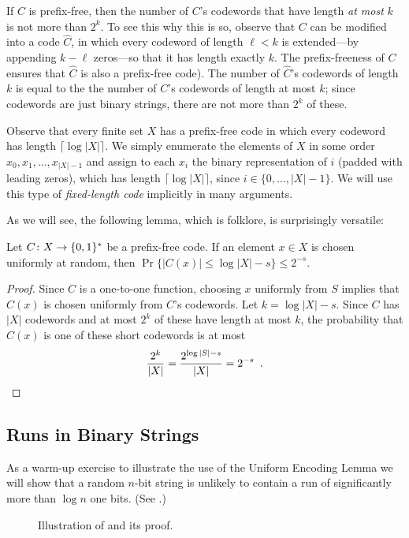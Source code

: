 \documentclass{patmorin}
\begin{document}
If $C$ is prefix-free, then the number of $C$'s codewords that have length
\emph{at most} $k$ is not more than $2^k$. To see this why this is so,
observe that $C$ can be modified into a code $\hat C$, in which every
codeword of length $\ell <k$ is extended---by appending $k-\ell$ zeros---so that
it has length exactly $k$. The prefix-freeness of $C$ ensures that $\hat
C$ is also a prefix-free code). The number of $\hat C$'s codewords of
length $k$ is equal to the the number of $C$'s codewords of length at
most $k$; since codewords are just binary strings, there are not more
than $2^k$ of these.

Observe that every finite set $X$ has a prefix-free code in which every
codeword has length $\lceil\log |X|\rceil$. We simply enumerate the
elements of $X$ in some order $x_0,x_1,\ldots,x_{|X|-1}$ and assign to
each $x_i$ the binary representation of $i$ (padded with leading zeros),
which has length $\lceil\log |X|\rceil$, since $i\in\{0,\ldots,|X|-1\}$.
We will use this type of \emph{fixed-length code} implicitly in many arguments.

As we will see, the following lemma, which is folklore, is surprisingly
versatile:
\begin{lem}
  Let $C\colon X\to \{0,1\}^*$ be a prefix-free code. If an element $x\in
  X$ is chosen uniformly at random, then $\Pr\{|C(x)|\le \log|X|-s\}\le
  2^{-s}$.
\end{lem}

\begin{proof}
  Since $C$ is a one-to-one function, choosing $x$ uniformly from $S$
  implies that $C(x)$ is chosen uniformly from $C$'s codewords. Let
  $k=\log|X|-s$. Since $C$ has $|X|$ codewords and at most $2^{k}$ of these
  have length at most $k$, the probability that $C(x)$ is one of these 
  short codewords is at most
  \[
     \frac{2^k}{|X|} = \frac{2^{\log|S|-s}}{|X|} = 2^{-s} \enspace . \qedhere 
  \]
\end{proof}

\subsection{Runs in Binary Strings}

As a warm-up exercise to illustrate the use of the Uniform Encoding
Lemma we will show that a random $n$-bit string is unlikely to contain
a run of significantly more than $\log n$ one bits.  (See .)

\begin{figure}
  \caption{Illustration of  and its proof.}
\end{figure}
\end{document}
